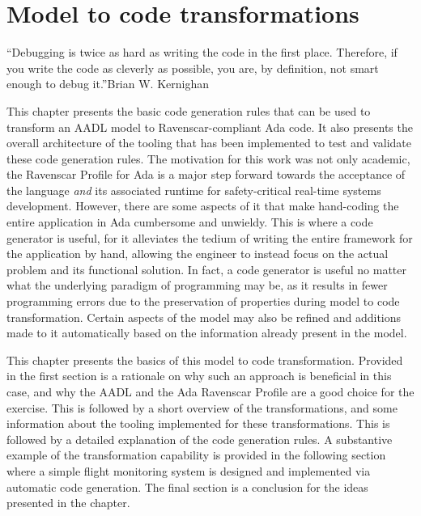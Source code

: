 \chapter{Model to code transformations}{``Debugging is twice as
  hard as writing the code in the first place. Therefore, if you write
  the code as cleverly as possible, you are, by definition, not smart
  enough to debug it.''}{Brian W. Kernighan}
\label{chap:code_gen}

This chapter presents the basic code generation rules that can be used
to transform an AADL model to Ravenscar-compliant Ada code. It also
presents the overall architecture of the tooling that has been
implemented to test and validate these code generation rules. The
motivation for this work was not only academic, the Ravenscar Profile
for Ada is a major step forward towards the acceptance of the language
\emph{and} its associated runtime for safety-critical real-time
systems development. However, there are some aspects of it that make
hand-coding the entire application in Ada cumbersome and
unwieldy. This is where a code generator is useful, for it alleviates
the tedium of writing the entire framework for the application by
hand, allowing the engineer to instead focus on the actual problem and
its functional solution. In fact, a code generator is useful no matter
what the underlying paradigm of programming may be, as it results in
fewer programming errors due to the preservation of properties during
model to code transformation. Certain aspects of the model may also be
refined and additions made to it automatically based on the
information already present in the model.

This chapter presents the basics of this model to code
transformation. Provided in the first section is a rationale on why
such an approach is beneficial in this case, and why the AADL and the
Ada Ravenscar Profile are a good choice for the exercise. This is
followed by a short overview of the transformations, and some
information about the tooling implemented for these
transformations. This is followed by a detailed explanation of the
code generation rules. A substantive example of the transformation
capability is provided in the following section where a simple flight
monitoring system is designed and implemented via automatic code
generation. The final section is a conclusion for the ideas presented
in the chapter.

